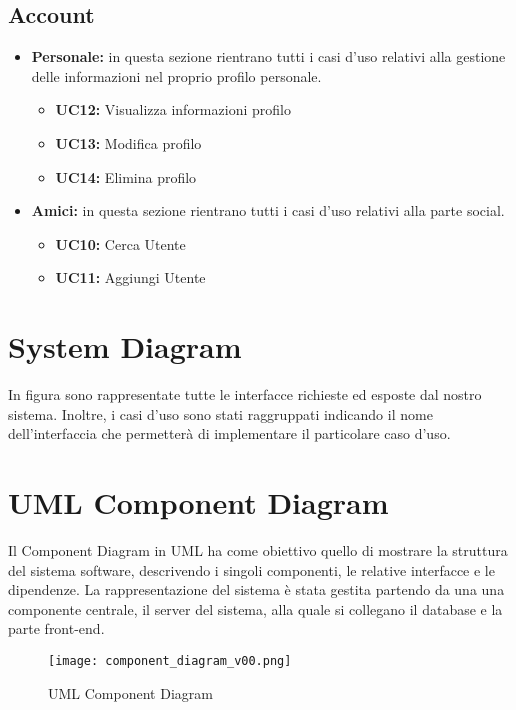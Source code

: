 \subsection{Account}
\begin{itemize}
    \item \textbf{Personale:} in questa sezione rientrano tutti i casi d'uso relativi alla gestione delle informazioni nel proprio profilo personale.
    \begin{itemize}
        \item \textbf{UC12:} Visualizza informazioni profilo 
        \item \textbf{UC13:} Modifica profilo 
        \item \textbf{UC14:} Elimina profilo 
    \end{itemize}
    
    \item \textbf{Amici:} in questa sezione rientrano tutti i casi d'uso relativi alla parte social.
    \begin{itemize}
        \item \textbf{UC10:} Cerca Utente 
        \item \textbf{UC11:} Aggiungi Utente 
    \end{itemize}
\end{itemize}

\newpage
\section{System Diagram}
In figura sono rappresentate tutte le interfacce richieste ed esposte dal nostro sistema. Inoltre,
i casi d'uso sono stati raggruppati indicando il nome dell'interfaccia che permetterà di implementare
il particolare caso d'uso.


\newpage

\section{UML Component Diagram}
Il Component Diagram in UML ha come obiettivo quello di mostrare la struttura
del sistema software, descrivendo i singoli componenti, le relative interfacce 
e le dipendenze. 
La rappresentazione del sistema è stata gestita partendo da una
una componente centrale, il server del sistema, alla quale si collegano il database e la parte front-end.


\begin{figure}[H]
    \centering
    \texttt{[image: component\_diagram\_v00.png]}
    \caption{UML Component Diagram}
    \label{fig-uml-component-diag}
\end{figure}



